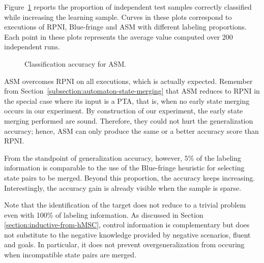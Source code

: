 Figure~\ref{image:evaluation-asm-accuracy} reports the proportion of independent test samples correctly classified while increasing the learning sample. Curves in these plots correspond to executions of RPNI, Blue-fringe and ASM with different labeling proportions. Each point in these plots represents the average value computed over 200 independent runs. 

\begin{figure}
\begin{center}
\caption{Classification accuracy for ASM\label{image:evaluation-asm-accuracy}.}
\end{center}
\end{figure}

ASM overcomes RPNI on all executions, which is actually expected. Remember from Section~\ref{subsection:automaton-state-merging} that ASM reduces to RPNI in the special case where its input is a PTA, that is, when no early state merging occurs in our experiment. By construction of our experiment, the early state merging performed are sound. Therefore, they could not hurt the generalization accuracy; hence, ASM can only produce the same or a better accuracy score than RPNI.

From the standpoint of generalization accuracy, however, 5\% of the labeling information is comparable to the use of the Blue-fringe heuristic for selecting state pairs to be merged. Beyond this proportion, the accuracy keeps increasing. Interestingly, the accuracy gain is already visible when the sample is sparse.

Note that the identification of the target does not reduce to a trivial problem even with 100\% of labeling information. As discussed in Section \ref{section:inductive-from-hMSC}, control information is complementary but does not substitute to the negative knowledge provided by negative scenarios, fluent and goals. In particular, it does not prevent overgeneralization from occuring when incompatible state pairs are merged. 
